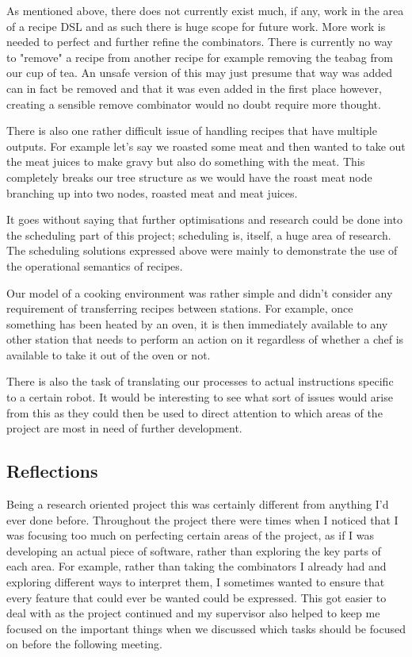 \documentclass[11pt]{article}
\begin{document}
As mentioned above, there does not currently exist much, if any, work in the area of
a recipe DSL and as such there is huge scope for future work. More work is needed
to perfect and further refine the combinators. There is currently no way to
"remove" a recipe from another recipe for example removing the teabag from our cup of tea.
An unsafe version of this may just presume that way was added can in fact be removed
and that it was even added in the first place however, creating a sensible remove
combinator would no doubt require more thought.

\medbreak

There is also one rather difficult issue of handling recipes that have multiple
outputs. For example let's say we roasted some meat and then wanted to take out the
meat juices to make gravy but also do something with the meat. This completely breaks
our tree structure as we would have the roast meat node branching up into two nodes,
roasted meat and meat juices.

\medbreak

It goes without saying that further optimisations and research could be done into the
scheduling part of this project; scheduling is, itself, a huge area of research.
The scheduling solutions expressed above were mainly to demonstrate the use of
the operational semantics of recipes.

\medbreak

Our model of a cooking environment was rather simple and didn't consider any requirement
of transferring recipes between stations. For example, once something has been heated
by an oven, it is then immediately available to any other station that needs to perform
an action on it regardless of whether a chef is available to take it out of the oven or not.

\medbreak

There is also the task of translating our processes to actual instructions specific to a certain
robot. It would be interesting to see what sort of issues would arise from this as they could then
be used to direct attention to which areas of the project are most in need of further development.

\subsection{Reflections}

Being a research oriented project this was certainly different from anything I'd ever done before.
Throughout the project there were times when I noticed that I was focusing too much on perfecting
certain areas of the project, as if I was developing an actual piece of software, rather than
exploring the key parts of each area. For example, rather than taking the combinators I already
had and exploring different ways to interpret them, I sometimes wanted to ensure that every feature
that could ever be wanted could be expressed. This got easier to deal with as the project
continued and my supervisor also helped to keep me focused on the important things when we discussed
which tasks should be focused on before the following meeting.
\end{document}
